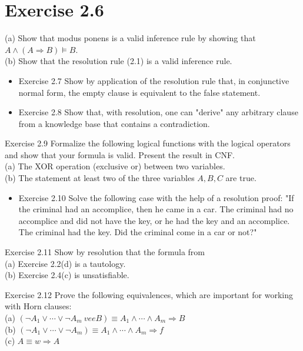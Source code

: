 \documentclass[10pt]{article}
\begin{document}
\section*{Exercise 2.6}
(a) Show that modus ponens is a valid inference rule by showing that $A \wedge(A \Rightarrow B) \models B$.\\
(b) Show that the resolution rule (2.1) is a valid inference rule.

\begin{itemize}
  \item Exercise 2.7 Show by application of the resolution rule that, in conjunctive normal form, the empty clause is equivalent to the false statement.
  \item Exercise 2.8 Show that, with resolution, one can "derive" any arbitrary clause from a knowledge base that contains a contradiction.
\end{itemize}

Exercise 2.9 Formalize the following logical functions with the logical operators and show that your formula is valid. Present the result in CNF.\\
(a) The XOR operation (exclusive or) between two variables.\\
(b) The statement at least two of the three variables $A, B, C$ are true.

\begin{itemize}
  \item Exercise 2.10 Solve the following case with the help of a resolution proof: "If the criminal had an accomplice, then he came in a car. The criminal had no accomplice and did not have the key, or he had the key and an accomplice. The criminal had the key. Did the criminal come in a car or not?"
\end{itemize}

Exercise 2.11 Show by resolution that the formula from\\
(a) Exercise 2.2(d) is a tautology.\\
(b) Exercise 2.4(c) is unsatisfiable.

Exercise 2.12 Prove the following equivalences, which are important for working with Horn clauses:\\
(a) $\left(\neg A_{1} \vee \cdots \vee \neg A_{m} \
vee B\right) \equiv A_{1} \wedge \cdots \wedge A_{m} \Rightarrow B$\\
(b) $\left(\neg A_{1} \vee \cdots \vee \neg A_{m}\right) \equiv A_{1} \wedge \cdots \wedge A_{m} \Rightarrow f$\\
(c) $A \equiv w \Rightarrow A$
\end{document}
